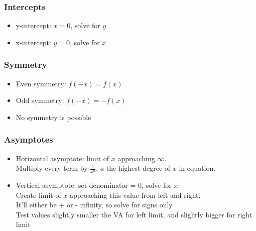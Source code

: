 \documentclass[a4paper,12pt]{article}
\begin{document}
\subsubsection{Intercepts}
\begin{itemize}
    \item{y-intercept: $x=0$, solve for $y$}
    \item{x-intercept: $y=0$, solve for $x$}
\end{itemize}

\subsubsection{Symmetry}
\begin{itemize}
    \item{Even symmetry: $f(-x) = f(x)$}
    \item{Odd symmetry: $f(-x) = -f(x)$}
    \item{No symmetry is possible}
\end{itemize}

\subsubsection{Asymptotes}
\begin{itemize}
    \item{Horizontal asymptote: limit of $x$ approaching $\infty$. \\Multiply every term by $\frac{1}{x^a}$, $a$ the highest degree of $x$ in equation. }
    \item{Vertical asymptote: set denominator = 0, solve for $x$. \\Create limit of $x$ approaching this value from left and right. \\It'll either be + or - infinity, so solve for signs only\\ Test values slightly smaller the VA for left limit, and slightly bigger for right limit}
\end{itemize}
\end{document}

